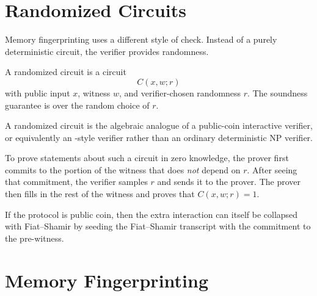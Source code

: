 \documentclass[11pt]{article}
\begin{document}
\section{Randomized Circuits}

Memory fingerprinting uses a different style of check.  Instead of a purely
deterministic circuit, the verifier provides randomness.

\begin{definition}
A randomized circuit is a circuit
\[
  C(x, w; r)
\]
with public input $x$, witness $w$, and verifier-chosen randomness $r$.  The
soundness guarantee is over the random choice of $r$.
\end{definition}

A randomized circuit is the algebraic analogue of a public-coin
interactive verifier, or equivalently an -style verifier rather
than an ordinary deterministic NP verifier.

To prove statements about such a circuit in zero knowledge, the prover first
commits to the portion of the witness that does \emph{not} depend on $r$.
After seeing that commitment, the verifier samples $r$ and sends it to the
prover.  The prover then fills in the rest of the witness and proves that
$C(x,w;r)=1$.

\begin{center}
\end{center}

If the protocol is public coin, then the extra interaction can itself be
collapsed with Fiat--Shamir by seeding the Fiat--Shamir transcript with the
commitment to the pre-witness.

\section{Memory Fingerprinting}
\end{document}
